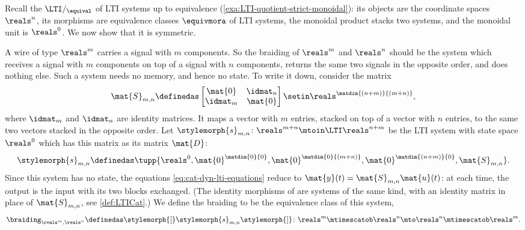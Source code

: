 \begin{example}
    \label{exa:LTI-quotient-symmetric}
    Recall the  $\LTI/_{\equival}$ of LTI systems up to equivalence (\cref{exa:LTI-quotient-strict-monoidal}): its objects are the coordinate spaces $\reals^n$, its morphisms are equivalence classes $\equivmora$ of LTI systems, the monoidal product stacks two systems, and the monoidal unit is $\reals^0$.
    We now show that it is symmetric.

    A wire of type $\reals^m$ carries a signal with $m$ components.
    So the braiding of $\reals^m$ and $\reals^n$ should be the system which receives a signal with $m$ components on top of a signal with $n$ components, returns the same two signals in the opposite order, and does nothing else.
    Such a system needs no memory, and hence no state.
    To write it down, consider the matrix
    \begin{equation}
        \label{eq:LTI-swap-matrix}
        \mat{S}_{m,n} \definedas
        \begin{bmatrix}
            \mat{0}  & \idmat_n \\
            \idmat_m & \mat{0}
        \end{bmatrix}
        \setin \reals^{\matdim{(n+m)}{(m+n)}},
    \end{equation}
    where $\idmat_m$ and $\idmat_n$ are identity matrices.
    It maps a vector with $m$ entries, stacked on top of a vector with $n$ entries, to the same two vectors stacked in the opposite order.
    Let $\stylemorph{s}_{m,n} \colon \reals^{m+n} \mtoin\LTI \reals^{n+m}$ be the LTI system with state space $\reals^0$ which has this matrix as its matrix $\mat{D}$:
    \begin{equation}
        \label{eq:LTI-swap-system}
        \stylemorph{s}_{m,n} \definedas
        \tupp{\reals^0, \mat{0}^{\matdim{0}{0}}, \mat{0}^{\matdim{0}{(m+n)}}, \mat{0}^{\matdim{(n+m)}{0}}, \mat{S}_{m,n}}.
    \end{equation}
    Since this system has no state, the equations \cref{eq:cat-dyn-lti-equations} reduce to $\mat{y}(t) = \mat{S}_{m,n}\mat{u}(t)$: at each time, the output is the input with its two blocks exchanged.
    (The identity morphisms of \LTI are systems of the same kind, with an identity matrix in place of $\mat{S}_{m,n}$, see \cref{def:LTICat}.)
    We define the braiding to be the equivalence class of this system,
    \begin{equation}
        \braiding_{\reals^m,\reals^n} \definedas \stylemorph{[}\stylemorph{s}_{m,n}\stylemorph{]} \colon \reals^m \mtimescatob \reals^n \mto \reals^n \mtimescatob \reals^m.
    \end{equation}


\end{example}
